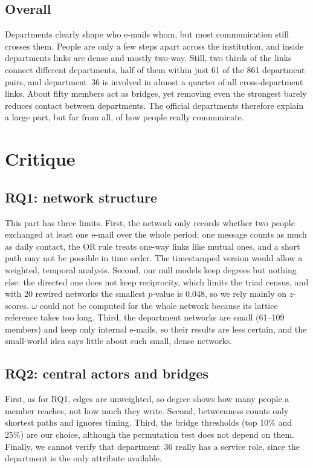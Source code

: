 \documentclass[12pt, a4paper]{article}
\begin{document}
\subsection{Overall}
Departments clearly shape who e-mails whom, but most communication still
crosses them. People are only a few steps apart across the institution, and
inside departments links are dense and mostly two-way. Still, two thirds of
the links connect different departments, half of them within just 61 of the
861 department pairs, and department~36 is involved in almost a quarter of all
cross-department links. About fifty members act as bridges, yet removing even
the strongest barely reduces contact between departments. The official
departments therefore explain a large part, but far from all, of how people
really communicate.

\section{Critique}
\label{critique}

\subsection{RQ1: network structure}
This part has three limits. First, the network only records whether two people
exchanged at least one e-mail over the whole period: one message counts as much
as daily contact, the OR rule treats one-way links like mutual ones, and a
short path may not be possible in time order. The timestamped version would
allow a weighted, temporal analysis. Second, our null models keep degrees but
nothing else: the directed one does not keep reciprocity, which limits the
triad census, and with 20 rewired networks the smallest $p$-value is 0.048, so
we rely mainly on $z$-scores. $\omega$ could not be computed for the whole
network because its lattice reference takes too long. Third, the department
networks are small (61--109 members) and keep only internal e-mails, so their
results are less certain, and the small-world idea says little about such
small, dense networks.

\subsection{RQ2: central actors and bridges}
First, as for RQ1, edges are unweighted, so degree shows how many people a
member reaches, not how much they write. Second, betweenness counts only
shortest paths and ignores timing. Third, the bridge thresholds (top 10\% and
25\%) are our choice, although the permutation test does not depend on them.
Finally, we cannot verify that department~36 really has a service role, since
the department is the only attribute available.
\end{document}
